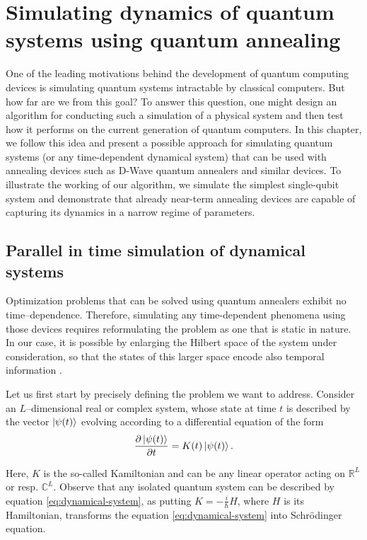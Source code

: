 \chapter{Simulating dynamics of quantum systems using quantum annealing}
\label{chapter:simulating}

One of the leading motivations behind the development of quantum computing
devices is simulating quantum systems intractable by classical computers. But
how far are we from this goal? To answer this question, one might design an
algorithm for conducting such a simulation of a physical system and then test
how it performs on the current generation of quantum computers. In this
chapter, we follow this idea and present a possible approach for simulating
quantum systems (or any time-dependent dynamical system) that can be used with
annealing devices such as D-Wave quantum annealers and similar devices. To
illustrate the working of our algorithm, we simulate the simplest single-qubit
system and demonstrate that already near-term annealing devices are capable of
capturing its dynamics in a narrow regime of parameters.

\section{Parallel in time simulation of dynamical systems}
Optimization problems that can be solved using quantum annealers exhibit no
time--dependence. Therefore, simulating any time-dependent phenomena using
those devices requires reformulating the problem as one that is static in
nature. In our case, it is possible by enlarging the Hilbert space of the
system under consideration, so that the states of this larger space encode also
temporal information \cite{feynmanclock}.

Let us first start by precisely defining the problem we want to address.
Consider an $L$--dimensional real or complex system, whose state at time $t$ is
described by the vector $\ket{\psi(t)}$ evolving according to a differential
equation of the form
\begin{equation}
  \label{eq:dynamical-system}
  \frac{\partial \ket{\psi(t)}}{\partial t} = K(t) \ket{\psi(t)}.
\end{equation}

Here, $K$ is the so-called Kamiltonian \cite{goldstein2002classical} and can be
any linear operator acting on $\mathbb{R}^L$ or resp. $\mathbb{C}^L$. Observe
that any isolated quantum system can be described by equation
\eqref{eq:dynamical-system}, as putting $K=-\frac{i}{\hbar}H$, where $H$ is its
Hamiltonian, transforms the equation \eqref{eq:dynamical-system} into
Schr\"{o}dinger equation.

